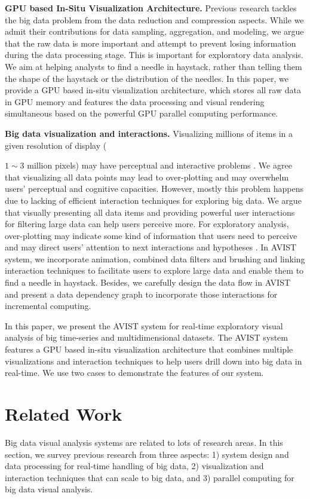 \documentclass[journal]{vgtc}                %
\begin{document}
\textbf{GPU based In-Situ Visualization Architecture.} Previous research tackles the big data problem from the data reduction and compression aspects. While we admit their contributions for data sampling, aggregation, and modeling, we argue that the raw data is more important and attempt to prevent losing information during the data processing stage. This is important for exploratory data analysis. We aim at helping analysts to find a needle in haystack, rather than telling them the shape of the haystack or the distribution of the needles. In this paper, we provide a GPU based in-situ visualization architecture, which stores all raw data in GPU memory and  features the data processing and visual rendering simultaneous based on the powerful GPU parallel computing performance. 

\textbf{Big data visualization and interactions.} Visualizing millions of items in a given resolution of display ({$1{\sim}3$ million pixels) may have perceptual and interactive problems \cite{2013-immens}. We agree that visualizing all data points may lead to over-plotting and may overwhelm users' perceptual and cognitive capacities. However, mostly this problem happens due to lacking of efficient interaction techniques for exploring big data. We argue that visually presenting all data items and providing powerful user interactions for filtering large data can help users perceive more. For exploratory analysis, over-plotting may indicate some kind of information that users need to perceive and may direct users' attention to  next interactions and hypotheses . In AVIST system, we incorporate animation, combined data filters and brushing and linking interaction techniques to facilitate users to explore large data and enable them to find a needle in haystack. Besides, we carefully design the data flow in AVIST and present a data dependency graph to incorporate those interactions for incremental computing. 
	 
In this paper, we present the AVIST system for real-time exploratory visual analysis of big time-series and multidimensional datasets. The AVIST system features a GPU based in-situ visualization architecture that combines multiple visualizations and interaction techniques to help users drill down into big data in real-time. We use two cases to demonstrate the features of our system.
      



\section{Related Work}
Big data visual analysis systems are related to lots of research areas. In this section, we survey previous research from three aspects: 1) system design and data processing for real-time handling of big data, 2) visualization and interaction techniques that can scale to big data, and 3) parallel computing for big data visual analysis. 
 


}
\end{document}

